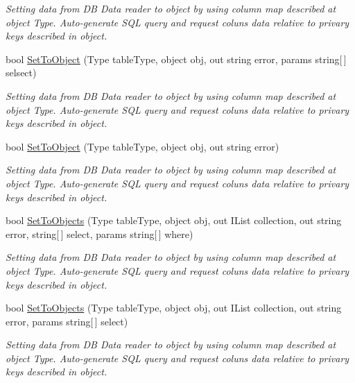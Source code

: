 \begin{DoxyCompactItemize}
\begin{DoxyCompactList}\small\item\em Setting data from DB Data reader to object by using column map described at object Type. Auto-\/generate S\+QL query and request coluns data relative to privary keys described in object. \end{DoxyCompactList}\item 
bool \mbox{\hyperlink{interface_uniform_data_operator_1_1_sql_1_1_i_sql_operator_ae1053edf9aa3d9385ef3591e7ee863c7}{Set\+To\+Object}} (Type table\+Type, object obj, out string error, params string\mbox{[}$\,$\mbox{]} selsect)
\begin{DoxyCompactList}\small\item\em Setting data from DB Data reader to object by using column map described at object Type. Auto-\/generate S\+QL query and request coluns data relative to privary keys described in object. \end{DoxyCompactList}\item 
bool \mbox{\hyperlink{interface_uniform_data_operator_1_1_sql_1_1_i_sql_operator_ac170526dd0fa31f2848ece5f5c5bb9d7}{Set\+To\+Object}} (Type table\+Type, object obj, out string error)
\begin{DoxyCompactList}\small\item\em Setting data from DB Data reader to object by using column map described at object Type. Auto-\/generate S\+QL query and request coluns data relative to privary keys described in object. \end{DoxyCompactList}\item 
bool \mbox{\hyperlink{interface_uniform_data_operator_1_1_sql_1_1_i_sql_operator_ae5c6fb9c7448e7171414b7d20095cc08}{Set\+To\+Objects}} (Type table\+Type, object obj, out I\+List collection, out string error, string\mbox{[}$\,$\mbox{]} select, params string\mbox{[}$\,$\mbox{]} where)
\begin{DoxyCompactList}\small\item\em Setting data from DB Data reader to object by using column map described at object Type. Auto-\/generate S\+QL query and request coluns data relative to privary keys described in object. \end{DoxyCompactList}\item 
bool \mbox{\hyperlink{interface_uniform_data_operator_1_1_sql_1_1_i_sql_operator_ac75ce5e3b29a8d2d94f96d4a9ff47820}{Set\+To\+Objects}} (Type table\+Type, object obj, out I\+List collection, out string error, params string\mbox{[}$\,$\mbox{]} select)
\begin{DoxyCompactList}\small\item\em Setting data from DB Data reader to object by using column map described at object Type. Auto-\/generate S\+QL query and request coluns data relative to privary keys described in object. \end{DoxyCompactList}\item 

\end{DoxyCompactItemize}
